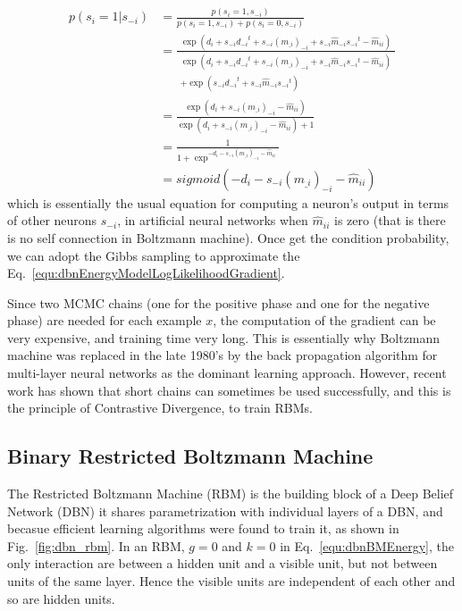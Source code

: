 \documentclass[runningheads,openany]{xhlPaper}
\begin{document}
\begin{displaymath}
\label{equ:dbn_bm_condition_probability}
\begin{aligned}
p\left( {{s_i} = 1|{s_{ - i}}} \right) &= \frac{{p\left( {{s_i} = 1,{s_{ - i}}} \right)}}{{p\left( {{s_i} = 1,{s_{ - i}}} \right) + p\left( {{s_i} = 0,{s_{ - i}}} \right)}}\\
 &= \frac{{\exp \left( {{d_i} + {s_{ - i}}{d_{ - i}}^t + {s_{ - i}}{{\left( {{m_{\_i}}} \right)}_{ - i}} + {s_{ - i}}{{\hat m}_{ - i}}{s_{ - i}}^t - {{\hat m}_{ii}}} \right)}}{\begin{array}{l}
\exp \left( {{d_i} + {s_{ - i}}{d_{ - i}}^t + {s_{ - i}}{{\left( {{m_{\_i}}} \right)}_{ - i}} + {s_{ - i}}{{\hat m}_{ - i}}{s_{ - i}}^t - {{\hat m}_{ii}}} \right)\\
 + \exp \left( {{s_{ - i}}{d_{ - i}}^t + {s_{ - i}}{{\hat m}_{ - i}}{s_{ - i}}^t} \right)
\end{array}}\\
 &= \frac{{\exp \left( {{d_i} + {s_{ - i}}{{\left( {{m_{\_i}}} \right)}_{ - i}} - {{\hat m}_{ii}}} \right)}}{{\exp \left( {{d_i} + {s_{ - i}}{{\left( {{m_{\_i}}} \right)}_{ - i}} - {{\hat m}_{ii}}} \right) + 1}}\\
 &= \frac{1}{{1 + {{\exp }^{ - {d_i} - {s_{ - i}}{{\left( {{m_{\_i}}} \right)}_{ - i}} - {{\hat m}_{ii}}}}}}\\
 &= sigmoid\left( { - {d_i} - {s_{ - i}}{{\left( {{m_{\_i}}} \right)}_{ - i}} - {{\hat m}_{ii}}} \right)
\end{aligned}
\end{displaymath}
which is essentially the usual equation for computing a neuron's output in terms of other neurons $s_{-i}$, in artificial neural networks when ${{{\hat m}_{ii}}}$ is zero (that is there is no self connection in Boltzmann machine).
Once get the condition probability, we can adopt the Gibbs sampling to approximate the Eq.~\ref{equ:dbnEnergyModelLogLikelihoodGradient}.

Since two MCMC chains (one for the positive phase and one for the negative phase) are needed for each example $x$, the computation of the gradient can be very expensive, and training time very long.
This is essentially why Boltzmann machine was replaced in the late 1980's by the back propagation algorithm for multi-layer neural networks as the dominant learning approach.
However, recent work has shown that short chains can sometimes be used successfully, and this is the principle of Contrastive Divergence, to train RBMs.

\subsection{Binary Restricted Boltzmann Machine}
\label{sec:dbnRBM}
The Restricted Boltzmann Machine (RBM) is the building block of a Deep Belief Network (DBN) it shares parametrization with individual layers of a DBN, and becasue efficient learning algorithms were found to train it, as shown in Fig.~\ref{fig:dbn_rbm}.
In an RBM, $g = 0$ and $k = 0$ in Eq.~\ref{equ:dbnBMEnergy}, the only interaction are between a hidden unit and a visible unit, but not between units of the same layer.
Hence the visible units are independent of each other and so are hidden units.
\end{document}
